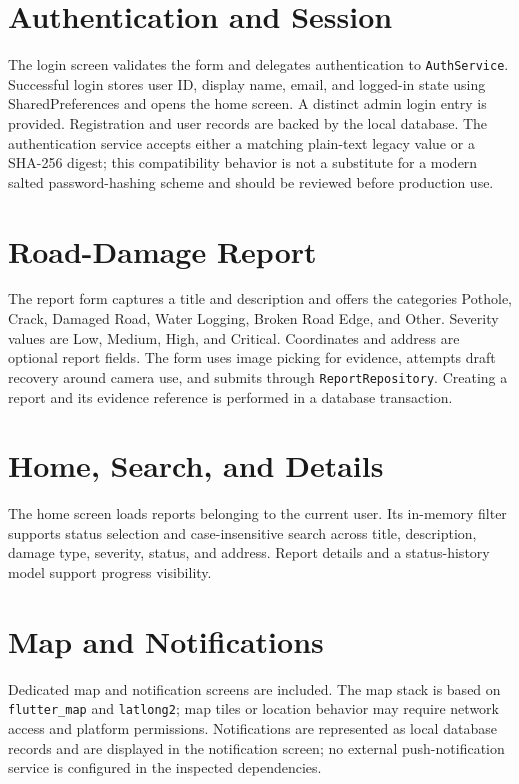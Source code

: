 \documentclass[12pt,a4paper]{report}
\begin{document}
\section{Authentication and Session}
The login screen validates the form and delegates authentication to \texttt{AuthService}. Successful login stores user ID, display name, email, and logged-in state using SharedPreferences and opens the home screen. A distinct admin login entry is provided. Registration and user records are backed by the local database. The authentication service accepts either a matching plain-text legacy value or a SHA-256 digest; this compatibility behavior is not a substitute for a modern salted password-hashing scheme and should be reviewed before production use.

\section{Road-Damage Report}
The report form captures a title and description and offers the categories Pothole, Crack, Damaged Road, Water Logging, Broken Road Edge, and Other. Severity values are Low, Medium, High, and Critical. Coordinates and address are optional report fields. The form uses image picking for evidence, attempts draft recovery around camera use, and submits through \texttt{ReportRepository}. Creating a report and its evidence reference is performed in a database transaction.

\section{Home, Search, and Details}
The home screen loads reports belonging to the current user. Its in-memory filter supports status selection and case-insensitive search across title, description, damage type, severity, status, and address. Report details and a status-history model support progress visibility.

\section{Map and Notifications}
Dedicated map and notification screens are included. The map stack is based on \texttt{flutter\_map} and \texttt{latlong2}; map tiles or location behavior may require network access and platform permissions. Notifications are represented as local database records and are displayed in the notification screen; no external push-notification service is configured in the inspected dependencies.
\end{document}
